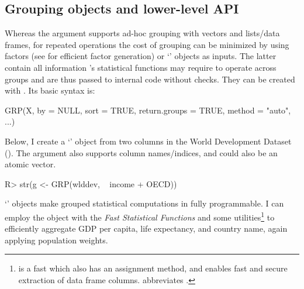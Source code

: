 \documentclass[article]{jss} %
\newcommand{\class}[1]{`\code{#1}'}
\newcommand{\fct}[1]{\code{#1()}}
\begin{document}
\subsection{Grouping objects and lower-level API} \label{ssec:gopt}
%
Whereas the  argument supports ad-hoc grouping with vectors and lists/data frames, for repeated operations the cost of grouping can be minimized by using factors (see  for efficient factor generation) or \class{GRP} objects as inputs. The latter contain all information 's statistical functions may require to operate across groups and are thus passed to internal  code without checks. They can be created with . Its basic syntax is:
\begin{Code}
GRP(X, by = NULL, sort = TRUE, return.groups = TRUE, method = "auto", ...)
\end{Code}
 Below, I create a \class{GRP} object from two columns in the World Development Dataset (\href{https://sebkrantz.github.io/collapse/reference/wlddev.html}{}). The  argument also supports column names/indices, and  could also be an atomic vector.
%
\begin{Schunk}
\begin{Sinput}
R> str(g <- GRP(wlddev, ~ income + OECD))
\end{Sinput}
\end{Schunk}
%
\class{GRP} objects make grouped statistical computations in  fully programmable. I can employ the object with the \emph{Fast Statistical Functions} and some utilities\footnote{\fct{add\_vars} is a fast \fct{cbind.data.frame} which also has an assignment method, and \fct{get\_vars} enables fast and secure extraction of data frame columns.  abbreviates .} to efficiently aggregate GDP per capita, life expectancy, and country name, again applying population weights.
\end{document}
